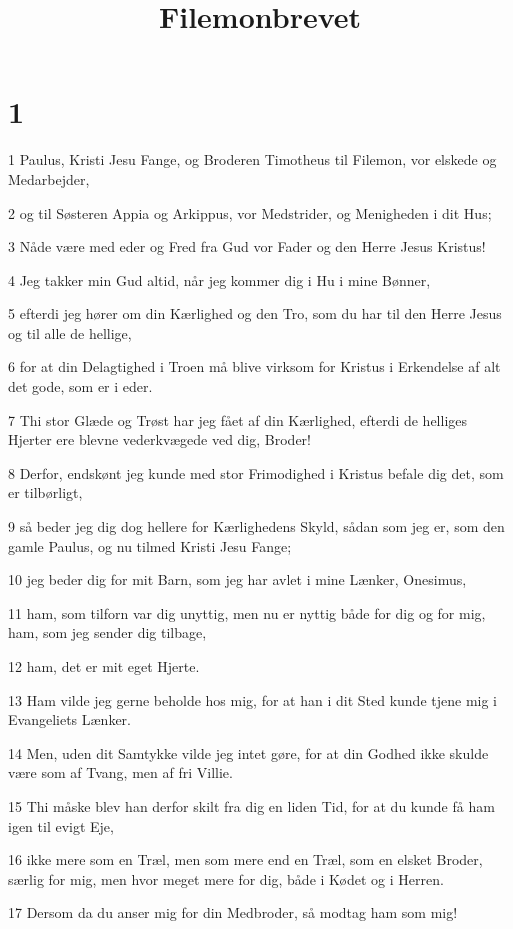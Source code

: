 

\title{Filemonbrevet}


\chapter{1}

\par 1 Paulus, Kristi Jesu Fange, og Broderen Timotheus til Filemon, vor elskede og Medarbejder,
\par 2 og til Søsteren Appia og Arkippus, vor Medstrider, og Menigheden i dit Hus;
\par 3 Nåde være med eder og Fred fra Gud vor Fader og den Herre Jesus Kristus!
\par 4 Jeg takker min Gud altid, når jeg kommer dig i Hu i mine Bønner,
\par 5 efterdi jeg hører om din Kærlighed og den Tro, som du har til den Herre Jesus og til alle de hellige,
\par 6 for at din Delagtighed i Troen må blive virksom for Kristus i Erkendelse af alt det gode, som er i eder.
\par 7 Thi stor Glæde og Trøst har jeg fået af din Kærlighed, efterdi de helliges Hjerter ere blevne vederkvægede ved dig, Broder!
\par 8 Derfor, endskønt jeg kunde med stor Frimodighed i Kristus befale dig det, som er tilbørligt,
\par 9 så beder jeg dig dog hellere for Kærlighedens Skyld, sådan som jeg er, som den gamle Paulus, og nu tilmed Kristi Jesu Fange;
\par 10 jeg beder dig for mit Barn, som jeg har avlet i mine Lænker, Onesimus,
\par 11 ham, som tilforn var dig unyttig, men nu er nyttig både for dig og for mig, ham, som jeg sender dig tilbage,
\par 12 ham, det er mit eget Hjerte.
\par 13 Ham vilde jeg gerne beholde hos mig, for at han i dit Sted kunde tjene mig i Evangeliets Lænker.
\par 14 Men, uden dit Samtykke vilde jeg intet gøre, for at din Godhed ikke skulde være som af Tvang, men af fri Villie.
\par 15 Thi måske blev han derfor skilt fra dig en liden Tid, for at du kunde få ham igen til evigt Eje,
\par 16 ikke mere som en Træl, men som mere end en Træl, som en elsket Broder, særlig for mig, men hvor meget mere for dig, både i Kødet og i Herren.
\par 17 Dersom da du anser mig for din Medbroder, så modtag ham som mig!
